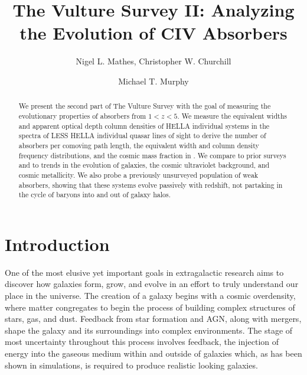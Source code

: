 \documentclass[linenumbers,twocolumn]{aastex61}
\begin{document}
\title{The Vulture Survey II: Analyzing the Evolution of CIV Absorbers}

\author{Nigel L. Mathes, Christopher W. Churchill}

\author{Michael T. Murphy}

\begin{abstract}
We present the second part of The Vulture Survey with the goal of measuring the evolutionary properties of {\CIV} absorbers from $1 < z < 5$. We measure the equivalent widths and apparent optical depth column densities of HELLA individual systems in the spectra of LESS HELLA individual quasar lines of sight to derive the number of absorbers per comoving path length, the equivalent width and column density frequency distributions, and the cosmic mass fraction in {\CIV}. We compare to prior surveys and to trends in the evolution of galaxies, the cosmic ultraviolet background, and cosmic metallicity. We also probe a previously unsurveyed population of weak {\CIV} absorbers, showing that these systems evolve passively with redshift, not partaking in the cycle of baryons into and out of galaxy halos.

\end{abstract}



\section{Introduction}
\label{sec:intro}

One of the most elusive yet important goals in extragalactic research aims to discover how galaxies form, grow, and evolve in an effort to truly understand our place in the universe. The creation of a galaxy begins with a cosmic overdensity, where matter congregates to begin the process of building complex structures of stars, gas, and dust. Feedback from star formation and AGN, along with mergers, shape the galaxy and its surroundings into complex environments. The stage of most uncertainty throughout this process involves feedback, the injection of energy into the gaseous medium within and outside of galaxies which, as has been shown in simulations, is required to produce realistic looking galaxies.
\end{document}

